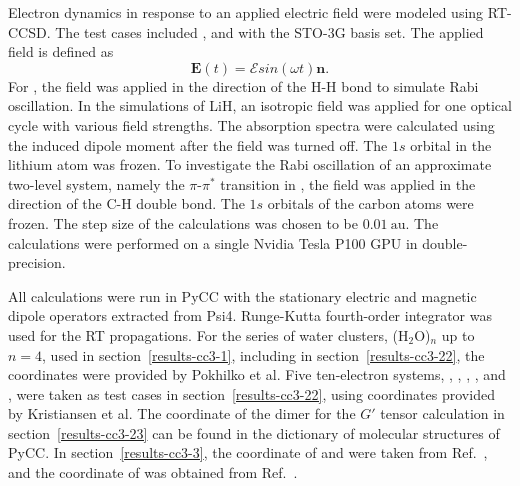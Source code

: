 Electron dynamics in response to an applied electric field were modeled using RT-CCSD. The test cases included ,  and  with the STO-3G basis set.\cite{Pietro1983} The applied field is defined as
\begin{equation}
\textbf{E}(t) = \mathcal{E}sin(\omega t)\textbf{n}.
\end{equation}
For , the field was applied in the direction of the H-H bond to simulate Rabi oscillation. In the simulations of LiH, an isotropic field was applied for one optical cycle with various field strengths. The absorption spectra were calculated using the induced dipole moment after the field was turned off. The $1s$ orbital in the lithium atom was frozen. To investigate the Rabi oscillation of an approximate two-level system, namely the $\pi$-$\pi^{*}$ transition in , the field was applied in the direction of the C-H double bond. The $1s$ orbitals of the carbon atoms were frozen. The step size of the calculations was chosen to be $0.01\ \text{au}$. The calculations were performed on a single Nvidia Tesla P100 GPU in double-precision.

All calculations were run in PyCC\cite{pycc} with the stationary electric and magnetic dipole operators extracted from Psi4. Runge-Kutta fourth-order integrator\cite{Butcher1996} was used for the RT propagations. For the series of water clusters, (H$_2$O)$_n$ up to $n=4$, used in section~\ref{results-cc3-1}, including  in section~\ref{results-cc3-22}, the coordinates were provided by Pokhilko et al.\cite{Pokhilko2018} Five ten-electron systems, , , , , and , were taken as test cases in section~\ref{results-cc3-22}, using coordinates provided by Kristiansen et al.\cite{Kristiansen2022} The coordinate of the  dimer for the $G'$ tensor calculation in section~\ref{results-cc3-23} can be found in the dictionary of molecular structures of PyCC. In section~\ref{results-cc3-3}, the coordinate of  and  were taken from Ref.~, and the coordinate of  was obtained from Ref.~.

